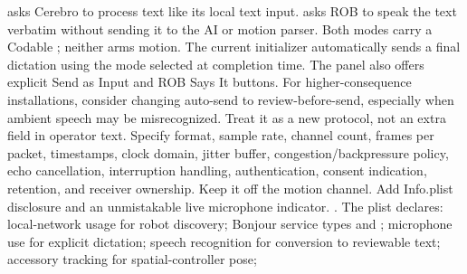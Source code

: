 {}\markdownRendererSectionBegin
{}\markdownRendererInterblockSeparator
{} asks Cerebro to process text like its local text input.  asks ROB to speak the text verbatim without sending it to the AI or motion parser. Both modes carry a Codable ; neither arms motion.\markdownRendererParagraphSeparator
{}The current initializer automatically sends a final dictation using the mode selected at completion time. The panel also offers explicit Send as Input and ROB Says It buttons. For higher-consequence installations, consider changing auto-send to review-before-send, especially when ambient speech may be misrecognized.\markdownRendererInterblockSeparator
{}
\markdownRendererSectionEnd \markdownRendererSectionBegin
{}\markdownRendererInterblockSeparator
{}Treat it as a new protocol, not an extra field in operator text. Specify format, sample rate, channel count, frames per packet, timestamps, clock domain, jitter buffer, congestion/backpressure policy, echo cancellation, interruption handling, authentication, consent indication, retention, and receiver ownership. Keep it off the motion channel. Add Info.plist disclosure and an unmistakable live microphone indicator.\markdownRendererInterblockSeparator
{}
\markdownRendererSectionEnd 
\markdownRendererSectionEnd \markdownRendererSectionBegin
{}\markdownRendererInterblockSeparator
{}\markdownRendererBlockQuoteBegin
{} .\markdownRendererBlockQuoteEnd \markdownRendererInterblockSeparator
{}The plist declares:\markdownRendererInterblockSeparator
{}\markdownRendererUlBegin
\markdownRendererUlItem local-network usage for robot discovery;\markdownRendererUlItemEnd 
\markdownRendererUlItem Bonjour service types  and ;\markdownRendererUlItemEnd 
\markdownRendererUlItem microphone use for explicit dictation;\markdownRendererUlItemEnd 
\markdownRendererUlItem speech recognition for conversion to reviewable text;\markdownRendererUlItemEnd 
\markdownRendererUlItem accessory tracking for spatial-controller pose;\markdownRendererUlItemEnd 

